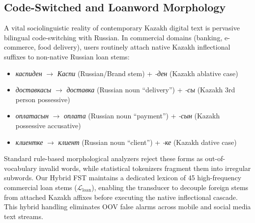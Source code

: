 \subsection{Code-Switched and Loanword Morphology}
A vital sociolinguistic reality of contemporary Kazakh digital text is pervasive bilingual code-switching with Russian. In commercial domains (banking, e-commerce, food delivery), users routinely attach native Kazakh inflectional suffixes to non-native Russian loan stems:
\begin{itemize}
    \item \textit{каспиден} $\rightarrow$ \textit{Каспи} (Russian/Brand stem) + \textit{-ден} (Kazakh ablative case)
    \item \textit{доставкасы} $\rightarrow$ \textit{доставка} (Russian noun ``delivery'') + \textit{-сы} (Kazakh 3rd person possessive)
    \item \textit{оплатасын} $\rightarrow$ \textit{оплата} (Russian noun ``payment'') + \textit{-сын} (Kazakh possessive accusative)
    \item \textit{клиентке} $\rightarrow$ \textit{клиент} (Russian noun ``client'') + \textit{-ке} (Kazakh dative case)
\end{itemize}
Standard rule-based morphological analyzers reject these forms as out-of-vocabulary invalid words, while statistical tokenizers fragment them into irregular subwords. Our Hybrid FST maintains a dedicated lexicon of 45 high-frequency commercial loan stems ($\mathcal{L}_{\text{loan}}$), enabling the transducer to decouple foreign stems from attached Kazakh affixes before executing the native inflectional cascade. This hybrid handling eliminates OOV false alarms across mobile and social media text streams.
